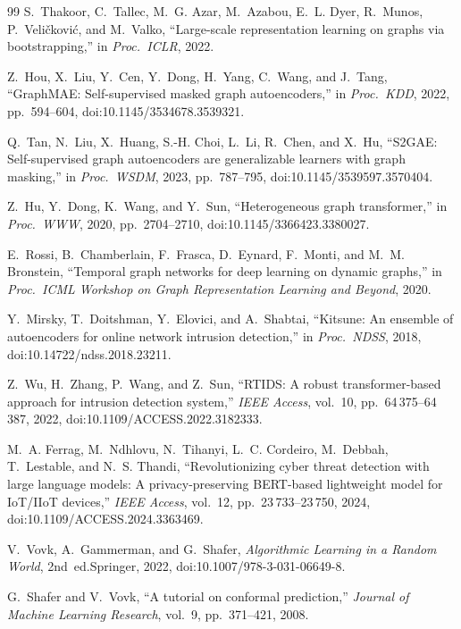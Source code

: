 \documentclass{ieeeaccess}
\begin{document}
\begin{thebibliography}{99}
S.~Thakoor, C.~Tallec, M.~G. Azar, M.~Azabou, E.~L. Dyer, R.~Munos,
P.~Veli\v{c}kovi\'{c}, and M.~Valko,
``Large-scale representation learning on graphs via bootstrapping,''
in \emph{Proc.\ ICLR}, 2022.

Z.~Hou, X.~Liu, Y.~Cen, Y.~Dong, H.~Yang, C.~Wang, and J.~Tang,
``GraphMAE: Self-supervised masked graph autoencoders,''
in \emph{Proc.\ KDD}, 2022, pp.~594--604,
doi:10.1145/3534678.3539321.

Q.~Tan, N.~Liu, X.~Huang, S.-H. Choi, L.~Li, R.~Chen, and X.~Hu,
``S2GAE: Self-supervised graph autoencoders are generalizable learners
with graph masking,''
in \emph{Proc.\ WSDM}, 2023, pp.~787--795,
doi:10.1145/3539597.3570404.

Z.~Hu, Y.~Dong, K.~Wang, and Y.~Sun,
``Heterogeneous graph transformer,''
in \emph{Proc.\ WWW}, 2020, pp.~2704--2710,
doi:10.1145/3366423.3380027.

E.~Rossi, B.~Chamberlain, F.~Frasca, D.~Eynard, F.~Monti, and M.~M. Bronstein,
``Temporal graph networks for deep learning on dynamic graphs,''
in \emph{Proc.\ ICML Workshop on Graph Representation Learning and
Beyond}, 2020.

Y.~Mirsky, T.~Doitshman, Y.~Elovici, and A.~Shabtai,
``Kitsune: An ensemble of autoencoders for online network intrusion
detection,''
in \emph{Proc.\ NDSS}, 2018, doi:10.14722/ndss.2018.23211.

Z.~Wu, H.~Zhang, P.~Wang, and Z.~Sun,
``RTIDS: A robust transformer-based approach for intrusion detection
system,''
\emph{IEEE Access}, vol.~10, pp.~64\,375--64\,387, 2022,
doi:10.1109/ACCESS.2022.3182333.

M.~A. Ferrag, M.~Ndhlovu, N.~Tihanyi, L.~C. Cordeiro, M.~Debbah,
T.~Lestable, and N.~S. Thandi,
``Revolutionizing cyber threat detection with large language models: A
privacy-preserving BERT-based lightweight model for IoT/IIoT devices,''
\emph{IEEE Access}, vol.~12, pp.~23\,733--23\,750, 2024,
doi:10.1109/ACCESS.2024.3363469.

V.~Vovk, A.~Gammerman, and G.~Shafer,
\emph{Algorithmic Learning in a Random World}, 2nd~ed.\quad Springer,
2022, doi:10.1007/978-3-031-06649-8.

G.~Shafer and V.~Vovk,
``A tutorial on conformal prediction,''
\emph{Journal of Machine Learning Research}, vol.~9, pp.~371--421, 2008.


\end{thebibliography}
\end{document}
